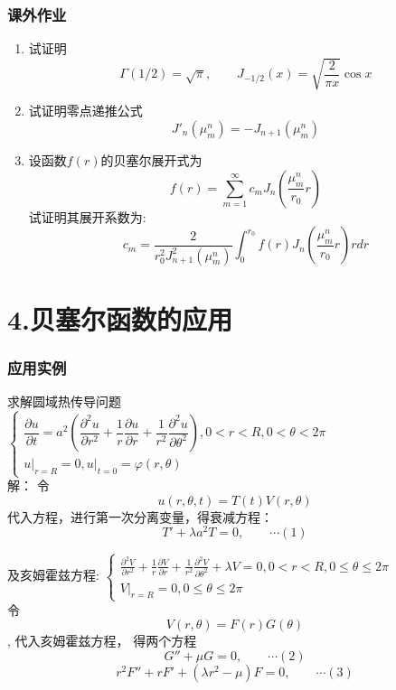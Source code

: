 \begin{frame}
	\frametitle{课外作业}
	\begin{enumerate}
		\item 试证明
		\begin{equation*}
			\Gamma(1/2)=\sqrt{\pi}, \qquad J_{-1/2}(x) = \sqrt{\frac{2}{\pi x}} \cos x  
		\end{equation*}
		\item 试证明零点递推公式  \[ J'_n(\mu_m ^n)= - J_{n+1}(\mu_m ^n)\]
		\item 设函数$f(r)$的贝塞尔展开式为
		\begin{equation*}
			f(r)=\sum_{m=1}^\infty c_m J_n(\frac{\mu_m ^n}{r_0} r)
		\end{equation*}	
		试证明其展开系数为: 
		\begin{equation*}
			c_m=\frac{2} {r^2_0 J_{n+1} ^2 (\mu_m ^n)} \int_0 ^{r_0} f(r) J_n(\frac{\mu_m ^n}{r_0} r) r dr 
		\end{equation*}	
	\end{enumerate}
\end{frame}

\section{4.贝塞尔函数的应用}
\begin{frame}
	\frametitle{应用实例}
	求解圆域热传导问题 \\
	$\left\{
		\begin{array}{l}
		\dfrac{\partial u}{\partial t}=a^{2}\left(\dfrac{\partial^{2} u}{\partial r^{2}}+\dfrac{1}{r} 
		\dfrac{\partial u}{\partial r}+\dfrac{1}{r^{2}} \dfrac{\partial^{2} u}{\partial \theta^{2}}\right), 0<r<R, 0<\theta<2 \pi \\
		\left. u\right|_{r=R}=0,\left.u\right|_{t=0}=\varphi(r, \theta)
	\end{array}
	\right. $\\
	\alert{解：} 令 
	\begin{equation*}
		u(r,\theta,t)= T(t) V(r, \theta) 
	\end{equation*}	
	代入方程，进行第一次分离变量，得衰减方程：\[T'+\lambda a^2 T=0, \qquad \cdots (1) \]	
\end{frame}

\begin{frame}
	及亥姆霍兹方程:
	$\left\{
	\begin{array}{l}
		\frac{\partial^{2} V}{\partial r^{2}}+\frac{1}{r} \frac{\partial V}{\partial r}+\frac{1}{r^{2}} 
		\frac{\partial^{2} V}{\partial \theta^{2}}+\lambda V=0, 0<r<R, 
		0 \leq \theta \leq 2 \pi \\
		\left.V\right|_{r=R}=0, 0 \leq \theta \leq 2 \pi
		\end{array}
	\right.$\\
	令\[V(r, \theta) =F(r)G(\theta)\], 代入亥姆霍兹方程， 得两个方程\\
	\[G''+\mu G=0, \qquad \cdots (2) \]
	\[r^2 F''+r F' +(\lambda r^2 -\mu )F=0, \qquad \cdots (3) \]
\end{frame}	


